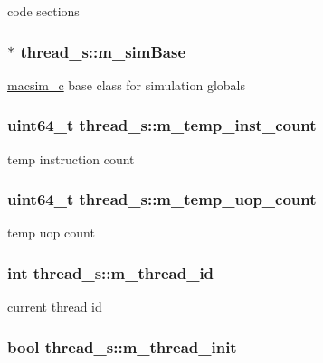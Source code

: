 \label{structthread__s_acbb56db74b9ba52acb14437d6f9e0231}
code sections \hypertarget{structthread__s_a95470a3e9e20649f4228016776325938}{
\subsubsection[{m\_\-simBase}]{$\ast$ {\bf thread\_\-s::m\_\-simBase}}}
\label{structthread__s_a95470a3e9e20649f4228016776325938}
\hyperlink{classmacsim__c}{macsim\_\-c} base class for simulation globals \hypertarget{structthread__s_ac7cf96053872c92c7f1b0b2488969ab7}{
\subsubsection[{m\_\-temp\_\-inst\_\-count}]{\setlength{\rightskip}{0pt plus 5cm}uint64\_\-t {\bf thread\_\-s::m\_\-temp\_\-inst\_\-count}}}
\label{structthread__s_ac7cf96053872c92c7f1b0b2488969ab7}
temp instruction count \hypertarget{structthread__s_aec816b397664eb8afeedab515c5afe8d}{
\subsubsection[{m\_\-temp\_\-uop\_\-count}]{\setlength{\rightskip}{0pt plus 5cm}uint64\_\-t {\bf thread\_\-s::m\_\-temp\_\-uop\_\-count}}}
\label{structthread__s_aec816b397664eb8afeedab515c5afe8d}
temp uop count \hypertarget{structthread__s_a04bae5c54623a9040e2c8bb136d27470}{
\subsubsection[{m\_\-thread\_\-id}]{\setlength{\rightskip}{0pt plus 5cm}int {\bf thread\_\-s::m\_\-thread\_\-id}}}
\label{structthread__s_a04bae5c54623a9040e2c8bb136d27470}
current thread id \hypertarget{structthread__s_afc7f4beee3959a7a0e9a783f01094902}{
\subsubsection[{m\_\-thread\_\-init}]{\setlength{\rightskip}{0pt plus 5cm}bool {\bf thread\_\-s::m\_\-thread\_\-init}}}
